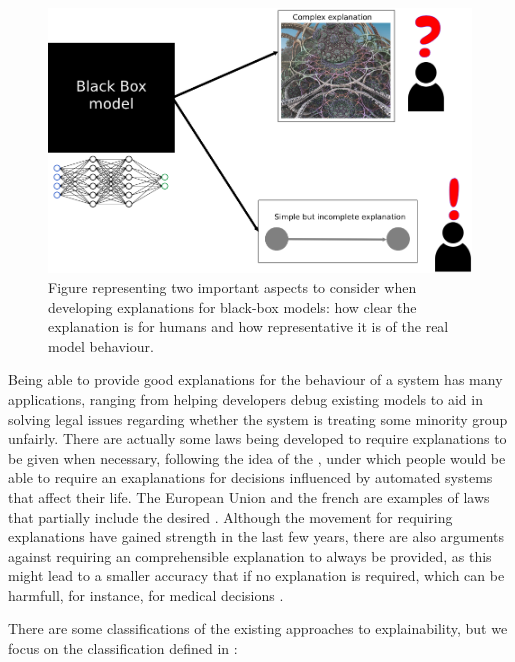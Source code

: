 \begin{figure}[ht]
\centering
\includegraphics[width=\textwidth]{blackBox}
\caption{Figure representing two important aspects to consider when developing explanations for black-box models: how clear the explanation is for humans and how representative it is of the real model behaviour.}\label{fig:blackBox}
\end{figure}

Being able to provide good explanations for the behaviour of a system has many applications, ranging from helping developers debug existing models to aid in solving legal issues regarding whether the system is treating some minority group unfairly. There are actually some laws being developed to require explanations to be given when necessary, following the idea of the , under which people would be able to require an exaplanations for decisions influenced by automated systems that affect their life. The European Union  and the french  are examples of laws that partially include the desired . Although the movement for requiring explanations have gained strength in the last few years, there are also arguments against requiring an comprehensible explanation to always be provided, as this might lead to a smaller accuracy that if no explanation is required, which can be harmfull, for instance, for medical decisions \cite{london2019artificial}.

There are some classifications of the existing approaches to explainability, but we focus on the classification defined in \cite{linardatos2020explainable}:

